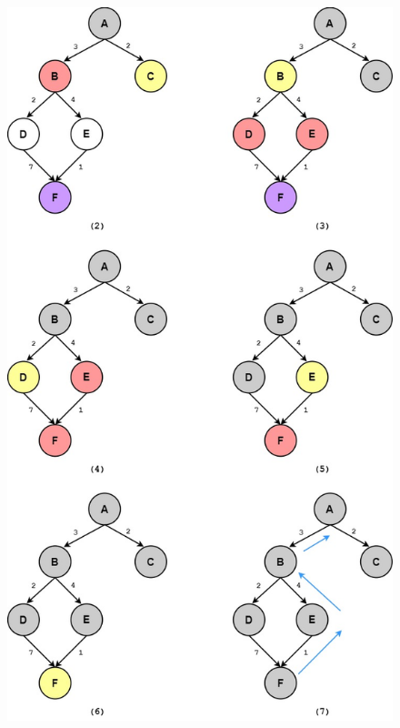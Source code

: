 \begin{figure}[H]
    \centering
    \includegraphics[scale=0.5]{pic/UCS1.jpg}
    \label{fig:my_label}
\end{figure}

